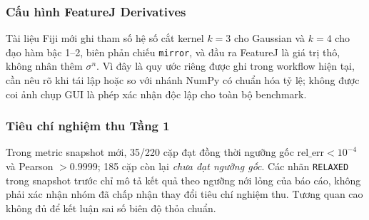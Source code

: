 \subsubsection{Cấu hình FeatureJ Derivatives}
Tài liệu Fiji mới ghi tham số hệ số cắt kernel $k=3$ cho Gaussian và
$k=4$ cho đạo hàm bậc 1--2, biên phản chiếu \texttt{mirror}, và đầu ra
FeatureJ là giá trị thô, không nhân thêm $\sigma^n$. Vì đây là quy ước
riêng được ghi trong workflow hiện tại, cần nêu rõ khi tái lập hoặc so với
nhánh NumPy có chuẩn hóa tỷ lệ; không được coi ảnh chụp GUI là phép xác nhận
độc lập cho toàn bộ benchmark.

\subsubsection{Tiêu chí nghiệm thu Tầng 1}
Trong metric snapshot mới, 35/220 cặp đạt đồng thời ngưỡng gốc
$\mathrm{rel\_err}<10^{-4}$ và Pearson $>0.9999$; 185 cặp còn lại
\emph{chưa đạt ngưỡng gốc}. Các nhãn \texttt{RELAXED} trong snapshot trước
chỉ mô tả kết quả theo ngưỡng nới lỏng của báo cáo, không phải xác nhận
nhóm đã chấp nhận thay đổi tiêu chí nghiệm thu. Tương quan cao không đủ
để kết luận sai số biên độ thỏa chuẩn.

